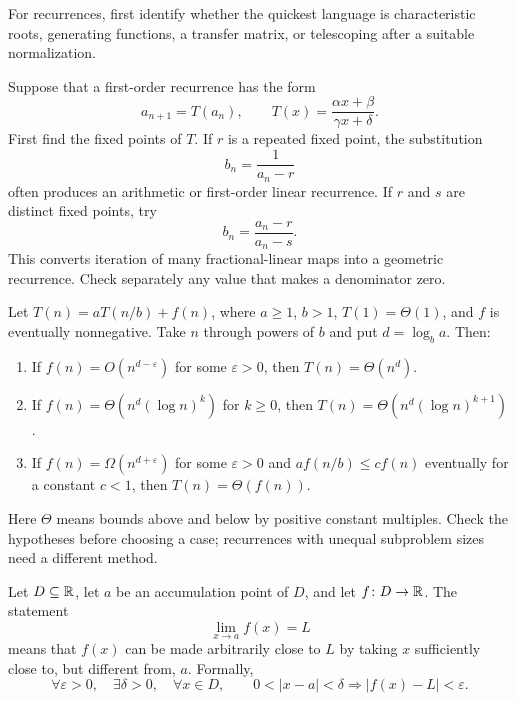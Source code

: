     \begin{strategy}
        For recurrences, first identify whether the quickest language is
        characteristic roots, generating functions, a transfer matrix, or
        telescoping after a suitable normalization.
    \end{strategy}

    \begin{tactic}
        Suppose that a first-order recurrence has the form
        \[
            a_{n+1}=T(a_n),
            \qquad
            T(x)=\frac{\alpha x+\beta}{\gamma x+\delta}.
        \]
        First find the fixed points of $T$. If $r$ is a repeated fixed point,
        the substitution
        \[
            b_n=\frac{1}{a_n-r}
        \]
        often produces an arithmetic or first-order linear recurrence. If
        $r$ and $s$ are distinct fixed points, try
        \[
            b_n=\frac{a_n-r}{a_n-s}.
        \]
        This converts iteration of many fractional-linear maps into a geometric
        recurrence. Check separately any value that makes a denominator zero.
    \end{tactic}

    \begin{theorem}
        Let $T(n)=aT(n/b)+f(n)$, where $a\geq1$, $b>1$,
        $T(1)=\Theta(1)$, and $f$ is eventually nonnegative. Take $n$ through
        powers of $b$ and put $d=\log_b a$. Then:
        \begin{enumerate}
            \item If $f(n)=O(n^{d-\varepsilon})$ for some $\varepsilon>0$,
                  then $T(n)=\Theta(n^d)$.
            \item If $f(n)=\Theta(n^d(\log n)^k)$ for $k\geq0$,
                  then $T(n)=\Theta(n^d(\log n)^{k+1})$.
            \item If $f(n)=\Omega(n^{d+\varepsilon})$ for some $\varepsilon>0$
                  and $af(n/b)\leq cf(n)$ eventually for a constant $c<1$,
                  then $T(n)=\Theta(f(n))$.
        \end{enumerate}
        Here $\Theta$ means bounds above and below by positive constant
        multiples. Check the hypotheses before choosing a case; recurrences
        with unequal subproblem sizes need a different method.
    \end{theorem}

    \begin{definition}
        Let $D\subseteq\mathbb{R}$, let $a$ be an accumulation point of $D$, and let
        $f\colon D\to\mathbb{R}$. The statement
        \[
            \lim\limits_{x\to a}f(x)=L
        \]
        means that $f(x)$ can be made arbitrarily close to $L$ by taking $x$
        sufficiently close to, but different from, $a$. Formally,
        \[
            \forall\varepsilon>0,
            \quad
            \exists\delta>0,
            \quad
            \forall x\in D,
            \qquad
            0<|x-a|<\delta
            \Rightarrow
            |f(x)-L|<\varepsilon.
        \]
    \end{definition}

